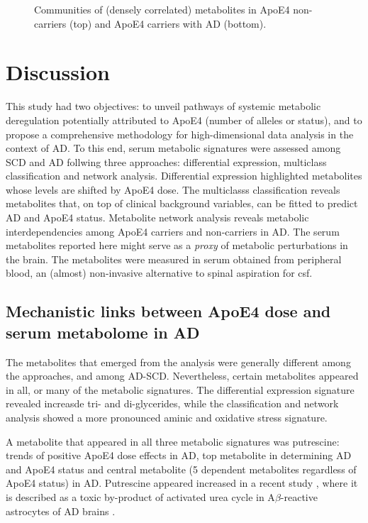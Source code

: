 \documentclass{amsart}
\begin{document}
\begin{figure}
  
  \caption{\label{comms} Communities of (densely correlated) metabolites in ApoE4 non-carriers (top) and ApoE4 carriers with AD (bottom).}
\end{figure}

\clearpage
\section{Discussion} \label{discuss}
This study had two objectives: to unveil pathways of systemic metabolic deregulation potentially attributed to ApoE4 (number of alleles or status), and to propose a comprehensive methodology for high-dimensional data analysis in the context of AD. To this end, serum metabolic signatures were assessed among SCD and AD follwing three approaches: differential expression, multiclass classification and network analysis. Differential expression highlighted metabolites whose levels are shifted by ApoE4 dose. The multiclasss classification reveals metabolites that, on top of clinical background variables, can be fitted to predict AD and ApoE4 status. Metabolite network analysis reveals metabolic interdependencies among ApoE4 carriers and non-carriers in AD. The serum metabolites reported here might serve as a \textit{proxy} of metabolic perturbations in the brain. The metabolites were measured in serum obtained from peripheral blood, an (almost) non-invasive alternative to spinal aspiration for \acrshort{csf}.

\subsection{Mechanistic links between ApoE4 dose and serum metabolome in AD}
The metabolites that emerged from the analysis were generally different among the approaches, and among AD-SCD. Nevertheless, certain metabolites appeared in all, or many of the metabolic signatures. The differential expression signature revealed increasde tri- and di-glycerides, while the classification and network analysis showed a more pronounced aminic and oxidative stress signature.

A metabolite that appeared in all three metabolic signatures was putrescine: trends of positive ApoE4 dose effects in AD, top metabolite in determining AD and ApoE4 status and central metabolite (5 dependent metabolites regardless of ApoE4 status) in AD. Putrescine appeared increased in a recent study \cite{Ju2021AstrocyticUC}, where it is described as a toxic by-product of activated urea cycle in A$\beta$-reactive astrocytes of AD brains \cite*{Ju2021AstrocyticUC,Wong2022PathogenicP}.
\end{document}

